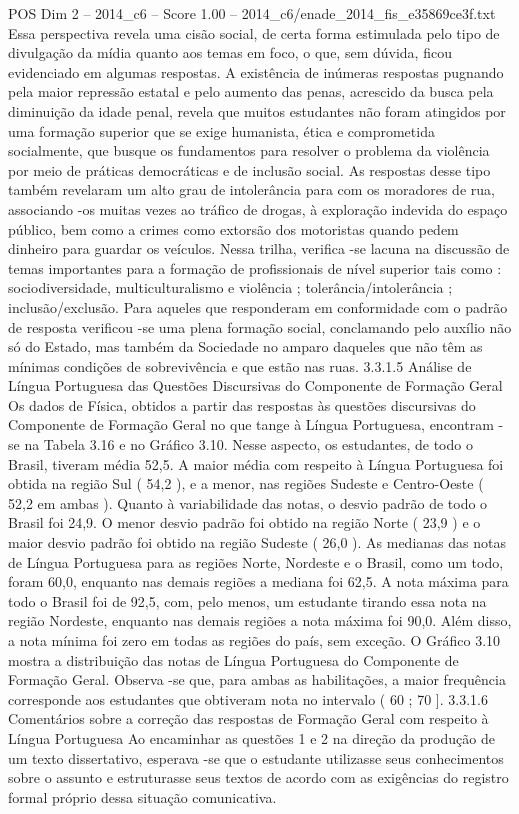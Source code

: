 \begin{textsample}{POS Dim 2 – 2014\_c6 – Score 1.00 – 2014\_c6/enade\_2014\_fis\_e35869ce3f.txt}
Essa perspectiva revela uma cisão social, de certa forma estimulada pelo tipo de divulgação da mídia quanto aos temas em foco, o que, sem dúvida, ficou evidenciado em algumas respostas.
A existência de inúmeras respostas pugnando pela maior repressão estatal e pelo aumento das penas, acrescido da busca pela diminuição da idade penal, revela que muitos estudantes não foram atingidos por uma formação superior que se exige humanista, ética e comprometida socialmente, que busque os fundamentos para resolver o problema da violência por meio de práticas democráticas e de inclusão social.
As respostas desse tipo também revelaram um alto grau de intolerância para com os moradores de rua, associando -os muitas vezes ao tráfico de drogas, à exploração indevida do espaço público, bem como a crimes como extorsão dos motoristas quando pedem dinheiro para guardar os veículos.
Nessa trilha, verifica -se lacuna na discussão de temas importantes para a formação de profissionais de nível superior tais como : sociodiversidade, multiculturalismo e violência ; tolerância/intolerância ; inclusão/exclusão.
Para aqueles que responderam em conformidade com o padrão de resposta verificou -se uma plena formação social, conclamando pelo auxílio não só do Estado, mas também da Sociedade no amparo daqueles que não têm as mínimas condições de sobrevivência e que estão nas ruas. 3.3.1.5 Análise de Língua Portuguesa das Questões Discursivas do Componente de Formação Geral Os dados de Física, obtidos a partir das respostas às questões discursivas do Componente de Formação Geral no que tange à Língua Portuguesa, encontram -se na Tabela 3.16 e no Gráfico 3.10.
Nesse aspecto, os estudantes, de todo o Brasil, tiveram média 52,5.
A maior média com respeito à Língua Portuguesa foi obtida na região Sul ( 54,2 ), e a menor, nas regiões Sudeste e Centro-Oeste ( 52,2 em ambas ).
Quanto à variabilidade das notas, o desvio padrão de todo o Brasil foi 24,9.
O menor desvio padrão foi obtido na região Norte ( 23,9 ) e o maior desvio padrão foi obtido na região Sudeste ( 26,0 ).
As medianas das notas de Língua Portuguesa para as regiões Norte, Nordeste e o Brasil, como um todo, foram 60,0, enquanto nas demais regiões a mediana foi 62,5.
A nota máxima para todo o Brasil foi de 92,5, com, pelo menos, um estudante tirando essa nota na região Nordeste, enquanto nas demais regiões a nota máxima foi 90,0.
Além disso, a nota mínima foi zero em todas as regiões do país, sem exceção.
O Gráfico 3.10 mostra a distribuição das notas de Língua Portuguesa do Componente de Formação Geral.
Observa -se que, para ambas as habilitações, a maior frequência corresponde aos estudantes que obtiveram nota no intervalo ( 60 ; 70 ]. 3.3.1.6 Comentários sobre a correção das respostas de Formação Geral com respeito à Língua Portuguesa Ao encaminhar as questões 1 e 2 na direção da produção de um texto dissertativo, esperava -se que o estudante utilizasse seus conhecimentos sobre o assunto e estruturasse seus textos de acordo com as exigências do registro formal próprio dessa situação comunicativa.

\end{textsample}
